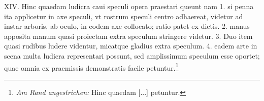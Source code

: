 \pend \pstart [p.~85] XIV. Hinc quaedam ludicra caui speculi\protect{} opera praestari queunt nam 1. si penna ita applicetur in axe speculi\protect{}, vt rostrum speculi\protect{} centro adhaereat, videtur ad instar arboris, ab oculo\protect{}, in eodem axe collocato; ratio patet ex dictis. 2. manus apposita manum quasi proiectam extra speculum\protect{} stringere videtur. 3. Duo item quasi rudibus ludere videntur, micatque gladius extra speculum\protect{}. 4. eadem arte in scena multa ludicra representari possunt, sed amplissimum speculum\protect{} esse oportet; quae omnia ex praemissis demonstratis facile petuntur.\footnote{\textit{Am Rand angestrichen:} Hinc quaedam [...] petuntur.}